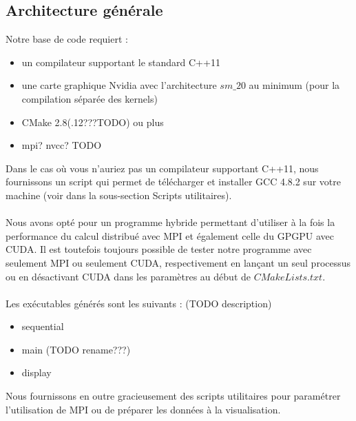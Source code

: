 \documentclass[12pt,a4paper,sans]{article}
\begin{document}
\subsection{Architecture générale}
Notre base de code requiert :
\begin{itemize}
    \item un compilateur supportant le standard C++11
    \item une carte graphique Nvidia avec l'architecture $sm\_20$ au minimum (pour la compilation séparée des kernels)
    \item CMake 2.8(.12???TODO) ou plus
    \item mpi? nvcc? TODO 
\end{itemize}

Dans le cas où vous n'auriez pas un compilateur supportant C++11, nous fournissons un script qui permet de télécharger et installer GCC 4.8.2 sur votre machine (voir dans la sous-section Scripts utilitaires).\\\\

Nous avons opté pour un programme hybride permettant d'utiliser à la fois la performance du calcul distribué avec MPI et également celle du GPGPU avec CUDA. Il est toutefois toujours possible de tester notre programme avec seulement MPI ou seulement CUDA, respectivement en lançant un seul processus ou en désactivant CUDA dans les paramètres au début de $CMakeLists.txt$.\\\\

Les exécutables générés sont les suivants : (TODO description)
\begin{itemize}
    \item sequential
    \item main (TODO rename???)
    \item display
\end{itemize}

Nous fournissons en outre gracieusement des scripts utilitaires pour paramétrer l'utilisation de MPI ou de préparer les données à la visualisation.
\end{document}
